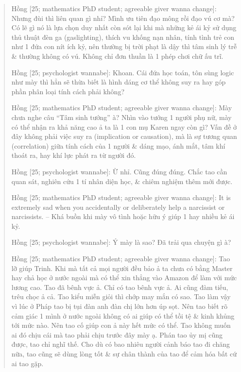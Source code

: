 \documentclass[12pt]{article}
\begin{document}
\begin{quote}
	{\sf Hồng [25; mathematics PhD student; agreeable giver wanna change]}: Nhưng đùi thì liên quan gì nhỉ? Mình ưu tiên đạo mông rồi đạo vú cơ mà? Có lẽ gì nó là lựa chọn duy nhất còn sót lại khi mà những kẻ ái kỷ sử dụng thủ thuật đèn ga (gaslighting), thích vu khống nạn nhân, tính tình trẻ con như 1 đứa con nít ích kỷ, nên thường bị trời phạt là dậy thì tâm sinh lý trễ \& thường không có vú. Không chỉ đơn thuần là 1 phép chơi chữ ấu trĩ.
	
	{\sf Hồng [25; psychologist wannabe]}: Khoan. Cái đứa học toán, tôn sùng logic như mày thì hẳn sẽ thừa biết là hình dáng cơ thể không suy ra hay góp phần phân loại tính cách phải không?
	
	{\sf Hồng [25; mathematics PhD student; agreeable giver wanna change]}: Mày chưa nghe câu ``Tâm sinh tướng'' à? Nhìn vào tướng 1 người phụ nữ, mày có thể nhận ra khả năng cao ả ta là 1 con mụ Karen ngay còn gì? Vấn đề ở đây không phải việc suy ra (implication or causation), mà là sự tương quan (correlation) giữa tính cách của 1 người \& dáng mạo, ánh mắt, tâm khí thoát ra, hay khí lực phát ra từ người đó.
	
	{\sf Hồng [25; psychologist wannabe]}: Ừ nhỉ. Cũng đúng đúng. Chắc tao cần quan sát, nghiên cứu 1 tí nhân diện học, \& chiêm nghiệm thêm mới được.
	
	{\sf Hồng [25; mathematics PhD student; agreeable giver wanna change]}: It is extremely sad when you accidentally or deliberately help a narcissist or narcissists. -- Khá buồn khi mày vô tình hoặc hữu ý giúp 1 hay nhiều kẻ ái kỷ.
	
	{\sf Hồng [25; psychologist wannabe]}: Ý mày là sao? Đã trải qua chuyện gì à?
	
	{\sf Hồng [25; mathematics PhD student; agreeable giver wanna change]}: Tao lỡ giúp Trinh. Khi mà tất cả mọi người đều bảo ả ta chưa có bằng Master hay chả học ở nước ngoài mà có thể xin thẳng vào Amazon để làm với mức lương cao. Tao đã bênh vực ả. Chỉ có tao bênh vực ả. Ai cũng đàm tiếu, trêu chọc ả cả. Tao kiểu miễn giỏi thì chớp may mắn có sao. Tao làm vậy vì lúc ở Pháp tao bị tụi đàn anh đàn chị lớn hơn úp sọt. Nên tao biết rõ cảm giác 1 mình ở nước ngoài không có ai giúp có thể tồi tệ \& kinh khủng tới mức nào. Nên tao cố giúp con ả này hết mức có  thể. Tao không muốn ai đó chịu cái mà tao phải chịu trước đây mày ạ. Phán tao ủy mị cũng được, tao chỉ nghĩ thế. Cho dù có bao nhiêu người cảnh báo tao đi chăng nữa, tao cũng sẽ dùng lòng tốt \& sự chân thành của tao để cảm hóa bất cứ ai tao gặp.
	

\end{quote}
\end{document}
